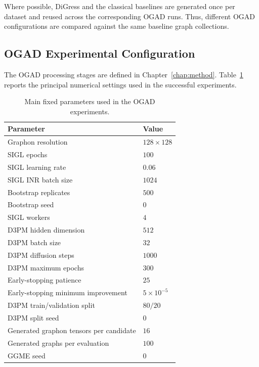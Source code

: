 Where possible, DiGress and the classical baselines are generated once per dataset and reused across the corresponding OGAD runs. Thus, different OGAD configurations are compared against the same baseline graph collections.


\subsection{OGAD Experimental Configuration}
\label{subsec:exp_ogad_configuration}

The OGAD processing stages are defined in Chapter~\ref{chap:method}. Table~\ref{tab:exp_fixed_parameters} reports the principal numerical settings used in the successful experiments.

\begin{table}[htbp]
    \centering
    \caption{Main fixed parameters used in the OGAD experiments.}
    \label{tab:exp_fixed_parameters}
    \begin{tabular}{ll}
        \hline
        Parameter & Value \\
        \hline
        Graphon resolution & \(128\times128\) \\
        SIGL epochs & \(100\) \\
        SIGL learning rate & \(0.06\) \\
        SIGL INR batch size & \(1024\) \\
        Bootstrap replicates & \(500\) \\
        Bootstrap seed & \(0\) \\
        SIGL workers & \(4\) \\
        D3PM hidden dimension & \(512\) \\
        D3PM batch size & \(32\) \\
        D3PM diffusion steps & \(1000\) \\
        D3PM maximum epochs & \(300\) \\
        Early-stopping patience & \(25\) \\
        Early-stopping minimum improvement & \(5\times10^{-5}\) \\
        D3PM train/validation split & \(80/20\) \\
        D3PM split seed & \(0\) \\
        Generated graphon tensors per candidate & \(16\) \\
        Generated graphs per evaluation & \(100\) \\
        GGME seed & \(0\) \\
        \hline
    \end{tabular}
\end{table}


